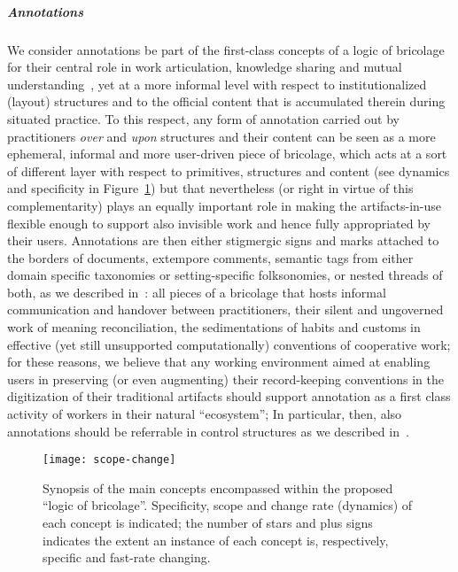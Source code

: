 \documentclass{article}
\begin{document}
\subparagraph{Annotations} We consider annotations be part of the first-class concepts of a logic of bricolage for their central role in work articulation, knowledge sharing and mutual understanding~\citep{luff_tasks--interaction:_1992,cadiz_using_2000,bringay_annotations:_2006,cabitza_leveraging_2012}, yet at a more informal level with respect to institutionalized (layout) structures and to the official content that is accumulated therein during situated practice. To this respect, any form of annotation carried out by practitioners \emph{over} and \emph{upon} structures and their content can be seen as a more ephemeral, informal and more user-driven piece of bricolage, which acts at a sort of different layer with respect to primitives, structures and content (see dynamics and specificity in Figure~\ref{fig:scope-change}) but that nevertheless (or right in virtue of this complementarity) plays an equally important role in making the artifacts-in-use flexible enough to support also invisible work and hence fully appropriated by their users. Annotations are then either stigmergic signs and marks attached to the borders of documents, extempore comments, semantic tags from either domain specific taxonomies or setting-specific folksonomies, or nested threads of both, as we described in~\citep{cabitza_supporting_2012}: all pieces of a bricolage that hosts informal communication and handover between practitioners, their silent and ungoverned work of meaning reconciliation, the sedimentations of habits and customs in effective (yet still unsupported computationally) conventions of cooperative work; for these reasons, we believe that any working environment aimed at enabling users in preserving (or even augmenting) their record-keeping conventions in the digitization of their traditional artifacts should support annotation as a first class activity of workers in their natural ``ecosystem''; In particular, then, also annotations should be referrable in control structures as we described in~\citep[p. 232]{cabitza_affording_2012}. 




\begin{figure}[tbh]
  \centering
      \texttt{[image: scope-change]}
  \caption{Synopsis of the main concepts encompassed within the proposed ``logic of bricolage''. Specificity, scope and change rate (dynamics) of each concept is indicated; the number of stars and plus signs indicates the extent an instance of each concept is, respectively, specific and fast-rate changing.}
  \label{fig:scope-change}
\end{figure}
\end{document}
